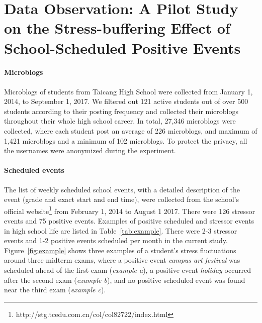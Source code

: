 \section{Data Observation: A Pilot Study on the Stress-buffering Effect of School-Scheduled Positive Events}
\label{sec:obs}
\paragraph{Microblogs} Microblogs of students from Taicang High School were collected from January 1, 2014, to September 1, 2017.
We filtered out 121 active students out of over 500 students according to their posting frequency
and collected their microblogs throughout their whole high school career.
In total, 27,346 microblogs were collected, 
where each student post an average of 226 microblogs, and maximum of 1,421 microblogs and a minimum of 102 microblogs.
To protect the privacy, all the usernames were anonymized during the experiment.

\paragraph{Scheduled events} The list of weekly scheduled school events, 
with a detailed description of the event (grade and exact start and end time), 
were collected from the school's official website\footnote{http://stg.tcedu.com.cn/col/col82722/index.html}
from February 1, 2014 to August 1 2017. 
There were 126 stressor events and 75 positive events. 
Examples of positive scheduled and stressor events in high school life are listed in Table~\ref{tab:example}.
There were 2-3 stressor events and 1-2 positive events scheduled per month in the current study.
Figure~\ref{fig:example} shows three examples of a student's stress fluctuations around three midterm exams,
where a positive event \emph{campus art festival} was scheduled ahead of the first exam (\emph{example a}),
a positive event \emph{holiday} occurred after the second exam (\emph{example b}),
and no positive scheduled event was found near the third exam (\emph{example c}).


\begin{table}[H]
\caption{\small{Examples of school-scheduled positive and stressor events.}}
\label{tab:example}
\end{table}

